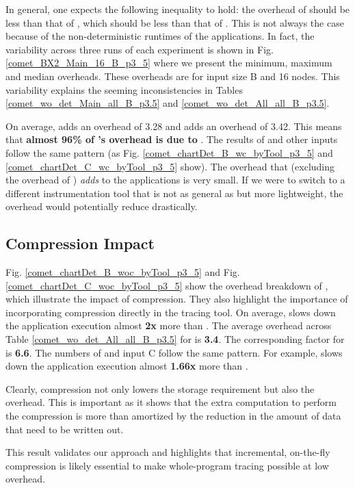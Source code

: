In general, one 
expects the following inequality to hold:
 the overhead of \pininit should be less than that of \parlot
, which should be less than that of \parlotnc. 
%
This is not always the case because of the non-deterministic runtimes of the applications.
%
In fact, the variability across three runs of each experiment
is shown in Fig. \ref{comet_BX2_Main_16_B_p3_5}
where we present the minimum, maximum and median overheads.
%
These
overheads are for input size B and 16 nodes. 
%
This variability explains the seeming inconsistencies in  Tables
\ref{comet_wo_det_Main_all_B_p3.5} and
\ref{comet_wo_det_All_all_B_p3.5}.


On average, \pininit adds
an overhead of 3.28  and \parlota adds an overhead of 3.42. 
%
This means that \textbf{almost 96\%
of \parlota's overhead is due to \pin}.
%
The results of \parlotm and
other inputs follow the same pattern
(as Fig. \ref{comet_chartDet_B_wc_byTool_p3_5} and \ref{comet_chartDet_C_wc_byTool_p3_5} show). 
%
The overhead that \parlot (excluding the overhead of \pininit) {\em adds}
to the applications is very small.
%
If we were to switch to a different
instrumentation tool that is not as general as \pin but more
lightweight, the overhead would potentially reduce drastically. \\


\subsection{Compression Impact} 
\label{subsec:compact}

Fig. \ref{comet_chartDet_B_woc_byTool_p3_5} and Fig. \ref{comet_chartDet_C_woc_byTool_p3_5} show the  overhead breakdown of \parlotnc, which illustrate the impact of compression. They also highlight the importance of incorporating compression directly in the tracing tool. 
%
On average, \parlotnc slows down the application execution almost \textbf{2x} more than \parlota. 
%
The average overhead 
across Table \ref{comet_wo_det_All_all_B_p3.5} for \parlota is \textbf{3.4}.
%
The  corresponding factor for \parlotnc is \textbf{6.6}. 
%
The numbers of \parlotm and input C  follow the same pattern. For example, \parlotnc slows down the application execution almost \textbf{1.66x} more than \parlotm.
%

Clearly, compression not only lowers the storage requirement but also the overhead. This is important as it shows that the extra computation to perform the compression is more than amortized by the reduction in the amount of data that need to be written out.
%

This result validates our approach and highlights that incremental, on-the-fly compression is likely essential to make whole-program tracing possible at low overhead.
